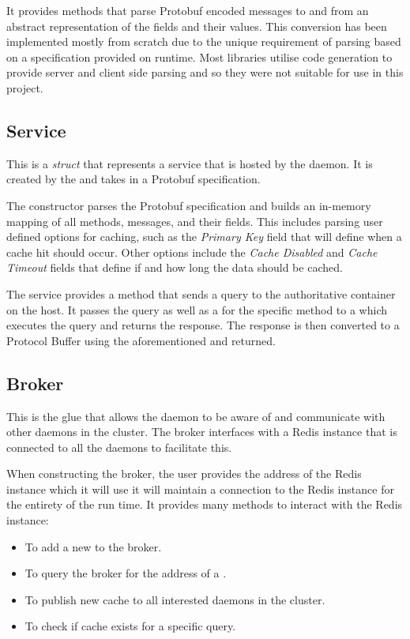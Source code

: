 \documentclass[a4paper]{article}
\begin{document}
It provides methods that parse Protobuf encoded messages to and from an abstract representation of the fields and their values. This conversion has been
implemented mostly from scratch due to the unique requirement of parsing based on a specification provided on runtime. Most libraries utilise code generation
to provide server and client side parsing and so they were not suitable for use in this project.

\subsection{Service}
\label{sec:service}
This is a \textit{struct} that represents a service that is hosted by the daemon. It is created by the \textit{} and
takes in a Protobuf specification.

The constructor parses the Protobuf specification and builds an in-memory mapping of all methods, messages, and their fields.
This includes parsing user defined options for caching, such as the \textit{Primary Key} field that will define when a cache hit should occur.
Other options include the \textit{Cache Disabled} and \textit{Cache Timeout} fields that define if and how long the data should be cached.

The service provides a method that sends a query to the authoritative container on the host.
It passes the query as well as a \textit{} for the specific method to a \textit{} which executes the query
and returns the response. The response is then converted to a Protocol Buffer using the aforementioned \textit{} and returned.

\subsection{Broker}
\label{sec:broker}

This is the glue that allows the daemon to be aware of and communicate with other daemons in the cluster.
The broker interfaces with a Redis \cite{redis} instance that is connected to all the daemons to facilitate this.

When constructing the broker, the user provides the address of the Redis instance which it will use it will maintain a connection to the Redis instance for the entirety of the run time.
It provides many methods to interact with the Redis instance:
\begin{itemize}
    \item To add a new \textit{} to the broker.
    \item To query the broker for the address of a \textit{}.
    \item To publish new cache to all interested daemons in the cluster.
    \item To check if cache exists for a specific query.
\end{itemize}
\end{document}
